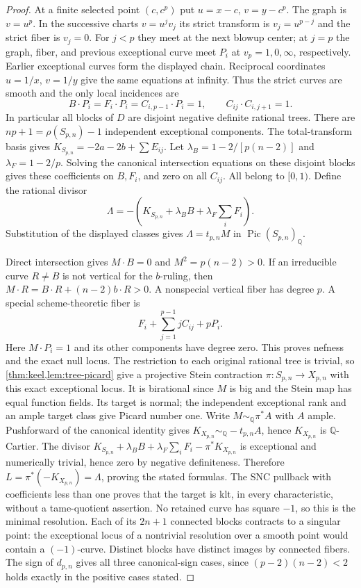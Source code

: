 \documentclass[11pt,reqno]{amsart}
\theoremstyle{definition}
\theoremstyle{remark}
\DeclareMathOperator{\Pic}{Pic}
\newcommand{\QQ}{\mathbb Q}
\numberwithin{equation}{section}
\begin{document}
\begin{proof}
At a finite selected point $(c,c^p)$ put $u=x-c$, $v=y-c^p$.
The graph is $v=u^p$. In the successive charts $v=u^jv_j$ its strict
transform is $v_j=u^{p-j}$ and the strict fiber is $v_j=0$.
For $j<p$ they meet at the next blowup center; at $j=p$ the graph,
fiber, and previous exceptional curve meet $P_i$ at $v_p=1,0,\infty$,
respectively. Earlier exceptional curves form the displayed chain.
Reciprocal coordinates $u=1/x$, $v=1/y$ give the same equations at
infinity. Thus the strict curves are smooth and the only local incidences
are
\[
 B\cdot P_i=F_i\cdot P_i=C_{i,p-1}\cdot P_i=1,\qquad
 C_{ij}\cdot C_{i,j+1}=1.
\]
In particular all blocks of $D$ are disjoint negative definite rational
trees. There are $np+1=\rho(S_{p,n})-1$ independent exceptional components.
The total-transform basis gives
$K_{S_{p,n}}=-2a-2b+\sum E_{ij}$.
Let $\lambda_B=1-2/[p(n-2)]$ and $\lambda_F=1-2/p$.
Solving the canonical intersection equations on these disjoint blocks gives
these coefficients on $B,F_i$, and zero on all $C_{ij}$. All belong to
$[0,1)$. Define the rational divisor
\[
 \Lambda=-\left(K_{S_{p,n}}+\lambda_BB+\lambda_F\sum_iF_i\right).
\]
Substitution of the displayed classes gives
$\Lambda=t_{p,n}M$ in $\Pic(S_{p,n})_{\QQ}$.

Direct intersection gives $M\cdot B=0$ and $M^2=p(n-2)>0$.
If an irreducible curve $R\ne B$ is not vertical for the $b$-ruling,
then $M\cdot R=B\cdot R+(n-2)b\cdot R>0$.
A nonspecial vertical fiber has degree $p$.
A special scheme-theoretic fiber is
\[
 F_i+\sum_{j=1}^{p-1}jC_{ij}+pP_i.
\]
Here $M\cdot P_i=1$ and its other components have degree zero.
This proves nefness and the exact null locus.
The restriction to each original rational tree is trivial, so
\cref{thm:keel,lem:tree-picard} give a projective Stein contraction
$\pi:S_{p,n}\to X_{p,n}$ with this exact exceptional locus.
It is birational since $M$ is big and the Stein map has equal function
fields. Its target is normal; the independent exceptional rank and an
ample target class give Picard number one. Write
$M\sim_{\QQ}\pi^*A$ with $A$ ample.
Pushforward of the canonical identity gives
$K_{X_{p,n}}\sim_{\QQ}-t_{p,n}A$, hence $K_{X_{p,n}}$ is $\QQ$-Cartier.
The divisor
$K_{S_{p,n}}+\lambda_BB+\lambda_F\sum_iF_i-\pi^*K_{X_{p,n}}$
is exceptional and numerically trivial, hence zero by negative
definiteness. Therefore $L=\pi^*(-K_{X_{p,n}})=\Lambda$, proving the
stated formulas.
The SNC pullback with coefficients less than one proves that the target
is klt, in every characteristic, without a tame-quotient assertion.
No retained curve has square $-1$, so this is the minimal resolution.
Each of its $2n+1$ connected blocks contracts to a singular point: the
exceptional locus of a nontrivial resolution over a smooth point would
contain a $(-1)$-curve. Distinct blocks have distinct images by connected
fibers. The sign of $d_{p,n}$ gives all three canonical-sign cases, since
$(p-2)(n-2)<2$ holds exactly in the positive cases stated.
\end{proof}
\end{document}
